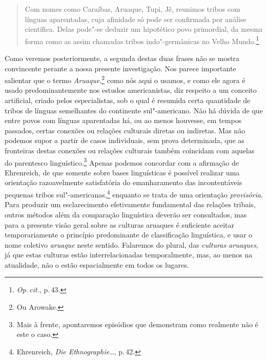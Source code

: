 \begin{quote}
Com nomes como Caraíbas, Aruaque, Tupi, Jê, reunimos tribos com línguas aparentadas, cuja afinidade só pode ser confirmada por análise científica. Delas pode"-se deduzir um hipotético povo primordial, da mesma forma como as assim chamadas tribos indo"-germânicas no Velho Mundo.\footnote{\textit{Op.\,cit.}, p.\,43.} 
\end{quote}

Como veremos posteriormente, a segunda destas duas frases não se
mostra convincente perante a nossa presente investigação. Nos parece
importante salientar que o termo \textit{Aruaque},\footnote{Ou Arowake.} como nós aqui o usamos, 
e como ele agora é usado predominantemente nos
estudos americanistas, diz respeito a um conceito artificial, criado
pelos especialistas, sob o qual é resumida certa quantidade de tribos
de línguas semelhantes do continente sul"-americano. Não há dúvida de que
entre povos com línguas aparentadas há, ou ao menos houvesse, em tempos
passados, certas conexões ou relações culturais diretas ou indiretas.
Mas não podemos supor a partir de casos individuais, sem prova
determinada, que as fronteiras destas conexões ou relações culturais
também coincidam com aquelas do parentesco linguístico.\footnote{Mais à frente, apontaremos episódios
que demonstram como realmente não é este o caso.} Apenas podemos
concordar com a afirmação de Ehrenreich, de que somente sobre bases
linguísticas é possível realizar uma orientação razoavelmente
satisfatória do emanharamento das incontentáveis pequenas tribos
sul"-americanas,\footnote{Ehrenreich, \textit{Die Ethnographie\ldots}, p.\,42.} enquanto se trata de uma
orientação \textit{provisória}. Para produzir um esclarecimento
efetivamente fundamental das relações tribais, outros métodos além da
comparação linguística deverão ser consultados, mas para a presente
visão geral sobre as culturas aruaques é suficiente aceitar
temporariamente o princípio predominante de classificação linguística, 
e usar o nome coletivo \textit{aruaque} neste
sentido. Falaremos do plural, das \textit{culturas aruaques}, já que estas
culturas estão interrelacionadas temporalmente, mas, ao menos na
atualidade, não o estão espacialmente em todos os lugares.

